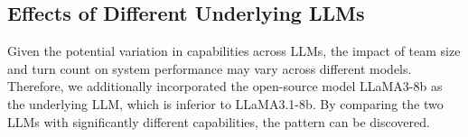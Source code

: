 \documentclass[11pt]{article}
\begin{document}



{
\subsection{Effects of Different Underlying LLMs}\label{app_models}
Given the potential variation in capabilities across LLMs, the impact of team size and turn count on system performance may vary across different models. Therefore, we additionally incorporated the open-source model LLaMA3-8b as the underlying LLM, which is inferior to LLaMA3.1-8b. By comparing the two LLMs with significantly different capabilities, the pattern can be discovered.
}
\end{document}
